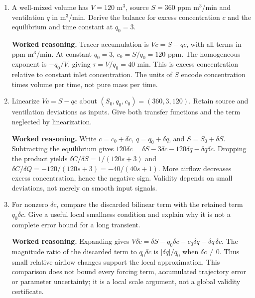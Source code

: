 \documentclass[10pt,a4paper]{article}
\newcommand{\answer}{\par\smallskip\textbf{Worked reasoning.} }
\begin{document}
\begin{enumerate}
\item A well-mixed volume has $V=120$ m$^3$, source $S=360$ ppm m$^3$/min and ventilation $q$ in m$^3$/min. Derive the balance for excess concentration $c$ and the equilibrium and time constant at $q_0=3$.
\answer Tracer accumulation is $V\dot c=S-qc$, with all terms in ppm m$^3$/min. At constant $q_0=3$, $c_0=S/q_0=120$ ppm. The homogeneous exponent is $-q_0/V$, giving $\tau=V/q_0=40$ min. This is excess concentration relative to constant inlet concentration. The units of $S$ encode concentration times volume per time, not pure mass per time.
\item Linearize $V\dot c=S-qc$ about $(S_0,q_0,c_0)=(360,3,120)$. Retain source and ventilation deviations as inputs. Give both transfer functions and the term neglected by linearization.
\answer Write $c=c_0+\delta c$, $q=q_0+\delta q$, and $S=S_0+\delta S$. Subtracting the equilibrium gives $120\delta\dot c=\delta S-3\delta c-120\delta q-\delta q\delta c$. Dropping the product yields $\delta C/\delta S=1/(120s+3)$ and $\delta C/\delta Q=-120/(120s+3)=-40/(40s+1)$. More airflow decreases excess concentration, hence the negative sign. Validity depends on small deviations, not merely on smooth input signals.
\item For nonzero $\delta c$, compare the discarded bilinear term with the retained term $q_0\delta c$. Give a useful local smallness condition and explain why it is not a complete error bound for a long transient.
\answer Expanding gives $V\delta\dot c=\delta S-q_0\delta c-c_0\delta q-\delta q\,\delta c$. The magnitude ratio of the discarded term to $q_0\delta c$ is $|\delta q|/q_0$ when $\delta c\ne0$. Thus small relative airflow changes support the local approximation. This comparison does not bound every forcing term, accumulated trajectory error or parameter uncertainty; it is a local scale argument, not a global validity certificate.
\end{enumerate}
\end{document}
